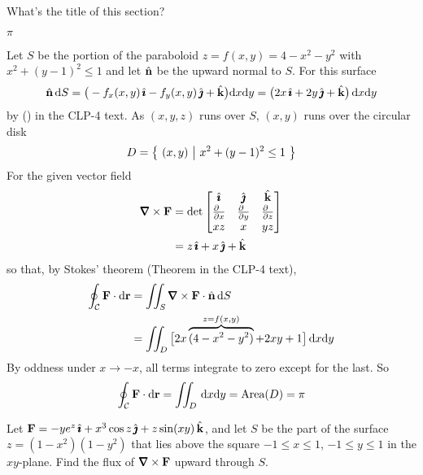 \begin{hint} 
What's the title of this section?
\end{hint}

\begin{answer} 
$\pi$
\end{answer}


\begin{solution}
Let $S$ be the portion of the paraboloid $z=f(x,y)=4-x^2-y^2$
with $x^2+(y-1)^2\le 1$ and let $\hat{\mathbf{n}}$ be the upward normal to $S$.
For this surface 
$$
\hat{\mathbf{n}}\,\mathrm{d}S=\big(-f_x(x,y)\,\hat{\pmb{\imath}} -f_y(x,y)\,\hat{\pmb{\jmath}} +\hat{\mathbf{k}}\big)\mathrm{d}x\mathrm{d}y
   = \big(2x\,\hat{\pmb{\imath}}+2y\,\hat{\pmb{\jmath}}+\hat{\mathbf{k}}\big)\,\mathrm{d}x\mathrm{d}y
$$
by () in the CLP-4 text. As $(x,y,z)$ runs over
$S$, $(x,y)$ runs over the circular disk
\begin{equation*}
D = \big\{ \ (x,y)\ \big|\ x^2+(y-1)^2\le 1\ \big\}
\end{equation*}
For the given vector field 
\begin{align*}
\vnabla\times\vF
&=\det\left[\begin{matrix}
\hi &\hj &\hk \\
\tfrac{\partial\hfill}{\partial x} & \tfrac{\partial\hfill}{\partial y} & 
                \tfrac{\partial\hfill}{\partial z} \\
xz & x & yz
\end{matrix}
\right] \\
&=z\,\hi+x\,\hj+\hk
\end{align*}
so that, by Stokes' theorem  (Theorem  in the CLP-4 text),
\begin{align*}
\oint_{\cC}\vF\cdot \dee{\vr}
&=\dblInt_S \vnabla\times\vF\cdot \hn\,\dee{S}\\
&=\dblInt_D
   \big[2x\overbrace{(4-x^2-y^2)}^{z=f(x,y)}+2xy+1\big]\,\dee{x}\dee{y}
\end{align*}
By oddness under $x\rightarrow -x$, all terms integrate to zero except
for the last. So
$$
\oint_{\mathcal{C}}\mathbf{F}\cdot \mathrm{d}\mathbf{r}
=\iint_D\,\mathrm{d}x\mathrm{d}y
=\text{Area}(D)
=\pi
$$
\end{solution}


\begin{question}
Let $\mathbf{F} = - ye^z\,\hat{\pmb{\imath}} + x^3\cos z\,\hat{\pmb{\jmath}} + z\sin(xy)\,\hat{\mathbf{k}}$, and let 
$S$ be the part of the surface $ z = (1-x^2)(1-y^2)$ that lies above the 
square $-1\le x\le 1$, $-1\le y\le 1$ in the $xy$-plane.  Find 
the flux of $\vnabla\times \vF$ upward through $S$. 
\end{question}

